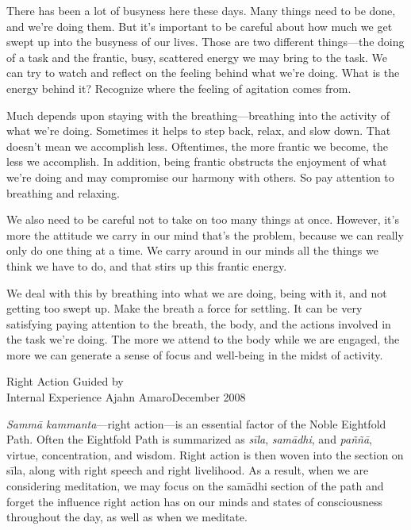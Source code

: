 
There has been a lot of busyness here these days. Many things need to 
be done, and we're doing them. But it's important to be careful about 
how much we get swept up into the busyness of our lives. Those are two 
different things---the doing of a task and the frantic, busy, scattered 
energy we may bring to the task. We can try to watch and reflect on the 
feeling behind what we're doing. What is the energy behind it? 
Recognize where the feeling of agitation comes from.

Much depends upon staying with the breathing---breathing into the 
activity of what we're doing. Sometimes it helps to step back, relax, 
and slow down. That doesn't mean we accomplish less. Oftentimes, the 
more frantic we become, the less we accomplish. In addition, being 
frantic obstructs the enjoyment of what we're doing and may compromise 
our harmony with others. So pay attention to breathing and relaxing.

We also need to be careful not to take on too many things at once. 
However, it's more the attitude we carry in our mind that's the 
problem, because we can really only do one thing at a time. We carry 
around in our minds all the things we think we have to do, and that 
stirs up this frantic energy.

We deal with this by breathing into what we are doing, being with it, 
and not getting too swept up. Make the breath a force for settling. It 
can be very satisfying paying attention to the breath, the body, and 
the actions involved in the task we're doing. The more we attend to the 
body while we are engaged, the more we can generate a sense of focus 
and well-being in the midst of activity.

{Right Action Guided by\\Internal Experience}
{Ajahn Amaro}{December 2008}

\emph{Sammā kammanta}---right action---is an essential factor of the 
Noble Eightfold Path. Often the Eightfold Path is summarized as 
\emph{sīla}, \emph{samādhi}, and \emph{paññā}, virtue, 
concentration, and wisdom. Right action is then woven into the section 
on sīla, along with right speech and right livelihood. As a result, 
when we are considering meditation, we may focus on the samādhi 
section of the path and forget the influence right action has on our 
minds and states of consciousness throughout the day, as well as when 
we meditate.

